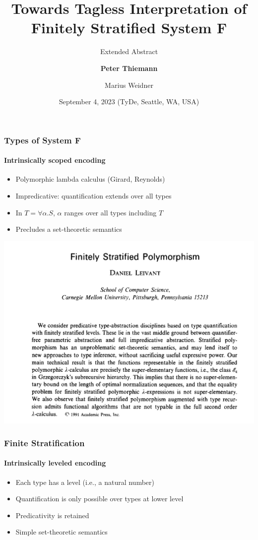 \documentclass[dvipsnames,aspectratio=169,pdftex]{beamer}
\title{Towards Tagless Interpretation of Finitely Stratified System F}
\subtitle{Extended Abstract}
\author[Thiemann, Weidner]
{
\textbf{Peter Thiemann} \and
{Marius Weidner} 
}
\institute{University of Freiburg, Germany
}
\date{September 4, 2023 (TyDe, Seattle, WA, USA)}
\begin{document}
\begin{frame}{\null}
  \titlepage 
\end{frame}
\begin{frame}
  \frametitle{Types of System F}
  \framesubtitle{Intrinsically scoped encoding}
  \SFType
  \begin{itemize}
  \item Polymorphic lambda calculus (Girard, Reynolds)
  \item Impredicative: quantification extends over all types
  \item In $T = \forall \alpha.S$, $\alpha$ ranges over all types including $T$
  \item Precludes a set-theoretic semantics
  \end{itemize}
\end{frame}
\begin{frame}
  \begin{center}
    \includegraphics[scale=0.25]{images/FinitelyStratifiedPolymorphism.png}
  \end{center}
\end{frame}
\begin{frame}
  \frametitle{Finite Stratification}
  \framesubtitle{Intrinsically leveled encoding}
  \begin{itemize}
  \item Each type has a level (i.e., a natural number)
  \item Quantification is only possible over types at lower level
  \item Predicativity is retained
  \item Simple set-theoretic semantics
  \end{itemize}
  \pause
  \TFType
  \pause\vspace{-2\baselineskip}
  \TFlevel
\end{frame}
\end{document}
